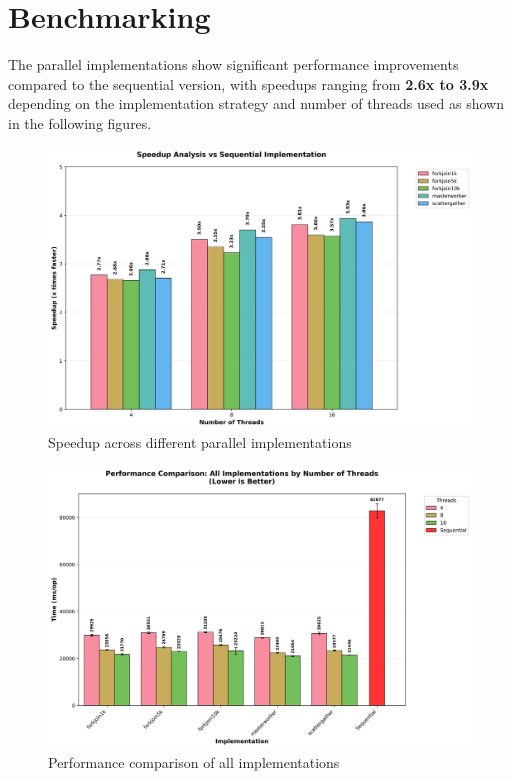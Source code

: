 \chapter{Benchmarking}\label{cap:benchmarking}

The parallel implementations show significant performance improvements compared
to the sequential version, with speedups ranging from \textbf{2.6x to 3.9x}
depending on the implementation strategy and number of threads used as shown in
the following figures.

\begin{figure}[htbp]
   \centering
    \includegraphics[width=\textwidth]{images/speedup_analysis.png}
    \caption{Speedup across different parallel implementations}
    \label{fig:speedup}
\end{figure}

\begin{figure}[htbp]
   \centering
   \includegraphics[width=\textwidth]{images/performance_comparison.png}
   \caption{Performance comparison of all implementations}
   \label{fig:performance}
\end{figure}

